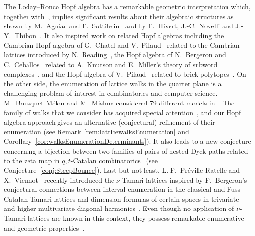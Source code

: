 \documentclass{amsart}
\theoremstyle{definition}
\begin{document}
The Loday--Ronco Hopf algebra has a remarkable geometric interpretation which, together with~\cite{GelfandKrobLascouxLeclercRetakhThibon,MalvenutoReutenauer}, implies significant results about their algebraic structures as shown by M.~Aguiar and F.~Sottile in~\cite{AguiarSottile-MalvenutoReutenauer, AguiarSottile-LodayRonco} and by F.~Hivert, J.-C.~Novelli and J.-Y.~Thibon~\cite{HivertNovelliThibon-algebraBinarySearchTrees}.
It also inspired work on related Hopf algebras including the Cambrian Hopf algebra of G.~Chatel and V.~Pilaud~\cite{ChatelPilaud} related to the Cambrian lattices introduced by N.~Reading~\cite{Reading-CambrianLattices}, the Hopf algebra of N.~Bergeron and C.~Ceballos~\cite{BergeronCeballos} related to A.~Knutson and E.~Miller's theory of subword complexes~\cite{KnutsonMiller-subwordComplex}, and the Hopf algebra of V.~Pilaud~\cite{Pilaud-brickAlgebra} related to brick polytopes~\cite{PilaudSantos-brickPolytope, PilaudStump-brickPolytopes}.
On the other side, the enumeration of lattice walks in the quarter plane is a challenging problem of interest in combinatorics and computer science.
M.~Bousquet-M\'elou and M.~Mishna considered 79 different models in~\cite{BousquetMelouMishna}.
The family of walks that we consider has acquired special attention~\cite{MishnaRechnitzer, MelczerMishna}, and our Hopf algebra approach gives an alternative (conjectural) refinement of their enumeration (see Remark~\ref{rem:latticewalksEnumeration} and Corollary~\ref{cor:walksEnumerationDeterminants}).
It also leads to a new conjecture concerning a bijection between two families of pairs of nested Dyck paths related to the zeta map in $q,t$-Catalan combinatorics~\cite{Haglund-qt-catalan} (see Conjecture~\ref{conj:SteepBounce}).
Last but not least, L.-F.~Pr\'eville-Ratelle and X.~Viennot~\cite{PrevilleRatelleViennot} recently introduced the $\nu$-Tamari lattices inspired by F.~Bergeron's conjectural connections between interval enumeration 
in the classical and Fuss--Catalan Tamari lattices and dimension formulas of certain spaces in trivariate and higher multivariate diagonal harmonics~\cite{BergeronPrevilleRatelle, BousquetMelouChapuyPrevilleRatelle, BousquetMelouFusyPrevilleRatelle}.
Even though no application of $\nu$-Tamari lattices are known in this context, they possess remarkable enumerative and geometric properties~\cite{FangPrevilleRatelle, CeballosPadrolSarmiento-geometryNuTamari}.

\medskip
\end{document}
